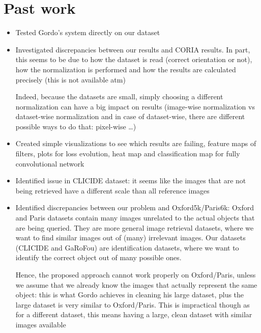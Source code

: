 \documentclass[fleqn]{article}
\begin{document}
\section{Past work}
\begin{itemize}
    \item Tested Gordo's system directly on our dataset
    \item Investigated discrepancies between our results and CORIA results.
    In part, this seems to be due to how the dataset is read (correct
    orientation or not), how the normalization is performed and how the
    results are calculated precisely (this is not available atm)

    Indeed, because the datasets are small, simply choosing a different
    normalization can have a big impact on results
    (image-wise normalization vs
    dataset-wise normalization and in case of dataset-wise, there are
    different possible ways to do that: pixel-wise \dots)

    \item Created simple visualizations to see which results are failing,
    feature maps of filters, plots for loss evolution, heat map and
    classification map for fully convolutional network

    \item Identified issue in CLICIDE dataset: it seems like the images
    that are not being retrieved have a different scale than all reference
    images

    \item Identified discrepancies between our problem and Oxford5k/Paris6k:
    Oxford and Paris datasets contain many images unrelated to the actual
    objects that are being queried. They are more general image retrieval
    datasets, where we want to find similar images out of (many) irrelevant
    images. Our datasets (CLICIDE and GaRoFou) are identification datasets,
    where we want to identify the correct object out of many possible ones.

    Hence, the proposed approach cannot work properly on Oxford/Paris, unless
    we assume that we already know the images that actually represent the
    same object: this is what Gordo achieves in cleaning his large dataset,
    plus the large dataset is very similar to Oxford/Paris. This is
    impractical though as for a different dataset, this means having a
    large, clean dataset with similar images available


\end{itemize}
\end{document}
